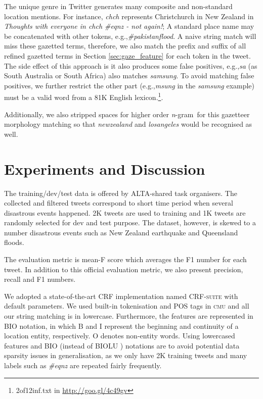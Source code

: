 \documentclass[11pt]{article}
\newcommand{\eg}{e.g.,\xspace}
\newcommand{\myex}[1]{\textit{#1}}
\newcommand{\method}[1]{\textsf{#1}\xspace}
\newcommand{\ngram}{\textit{n}-gram\ }
\newcommand{\cmu}{\textsc{cmu}\xspace}
\newcommand{\crfsuite}{\textsc{CRF-suite}\xspace}
\newcommand{\myurl}[1]{{\footnotesize\url{#1}}}
\newcommand{\secref}[2][]{Section#1 \ref{#2}}
\begin{document}
The unique genre in Twitter generates many composite and non-standard location mentions.
For instance, \myex{chch} represents Christchurch in New Zealand in \myex{Thoughts with everyone in chch \#eqnz - not again!}; 
A standard place name may be concatenated with other tokens, \eg \myex{\#pakistanflood}.
A naive string match will miss these gazetted terms, therefore, we also match the prefix and suffix of all refined gazetted terms in \secref{sec:gaze_feature} for each token in the tweet.
The side effect of this approach is it also produces some false positives, \eg \myex{sa} (as South Australia or South Africa) also matches \myex{samsung}.
To avoid matching false positives, we further restrict the other part (\eg \myex{msung} in the \myex{samsung} example) must be a valid word from a 81K English lexicon.\footnote{2of12inf.txt in \myurl{http://goo.gl/4c49gv}}.

Additionally, we also stripped spaces for higher order \ngram for this gazetteer morphology matching so that \myex{newzealand} and \myex{losangeles} would be recognised as well.

\section{Experiments and Discussion}
\label{sec:experiment}

The training/dev/test data is offered by ALTA-shared task organisers.
The collected and filtered tweets correspond to short time period when several disastrous events happened.
2K tweets are used to training and 1K tweets are randomly selected for dev and test purpose.
The dataset, however, is skewed to a number disastrous events such as New Zealand earthquake and Queensland floods.

The evaluation metric is mean-F score which averages the F1 number for each tweet.
In addition to this official evaluation metric, we also present precision, recall and F1 numbers.

We adopted a state-of-the-art CRF implementation named \crfsuite \cite{crfsuite} with default parameters.
We used built-in tokenisation and POS tags in \cmu and all our string matching is in lowercase.
Furthermore, the features are represented in \method{BIO} notation, in which \method{B} and \method{I} represent the beginning and continuity of a location entity, respectively.
\method{O} denotes non-entity words.
Using lowercased features and \method{BIO} (instead of \method{BIOLU} \cite{conll09rati}) notations are to avoid potential data sparsity issues in generalisation, as we only have 2K training tweets and many labels such as \myex{\#eqnz} are repeated fairly frequently.
\end{document}
